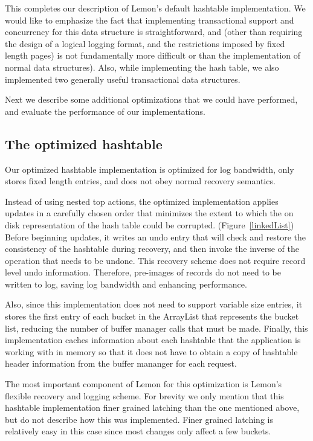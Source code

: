 \documentclass[letterpaper,twocolumn,english]{article}
\newcommand{\yad}{Lemon\xspace}
\begin{document}
This completes our description of \yad's default hashtable
implementation.  We would like to emphasize the fact that implementing
transactional support and concurrency for this data structure is
straightforward, and (other than requiring the design of a logical
logging format, and the restrictions imposed by fixed length pages) is
not fundamentally more difficult or than the implementation of normal
data structures).  Also, while implementing the hash table, we also
implemented two generally useful transactional data structures.

Next we describe some additional optimizations that
we could have performed, and evaluate the performance of our
implementations.

\subsection{The optimized hashtable}

Our optimized hashtable implementation is optimized for log
bandwidth, only stores fixed length entries, and does not obey normal
recovery semantics.  

Instead of using nested top actions, the optimized implementation
applies updates in a carefully chosen order that minimizes the extent
to which the on disk representation of the hash table could be
corrupted.  (Figure~\ref{linkedList}) Before beginning updates, it
writes an undo entry that will check and restore the consistency of
the hashtable during recovery, and then invoke the inverse of the
operation that needs to be undone.  This recovery scheme does not
require record level undo information.  Therefore, pre-images of
records do not need to be written to log, saving log bandwidth and
enhancing performance.

Also, since this implementation does not need to support variable size
entries, it stores the first entry of each bucket in the ArrayList
that represents the bucket list, reducing the number of buffer manager
calls that must be made.  Finally, this implementation caches
information about each hashtable that the application is working with
in memory so that it does not have to obtain a copy of hashtable
header information from the buffer mananger for each request.

The most important component of \yad for this optimization is \yad's
flexible recovery and logging scheme.  For brevity we only mention
that this hashtable implementation finer grained latching than the one
mentioned above, but do not describe how this was implemented.  Finer
grained latching is relatively easy in this case since most changes
only affect a few buckets.
\end{document}
